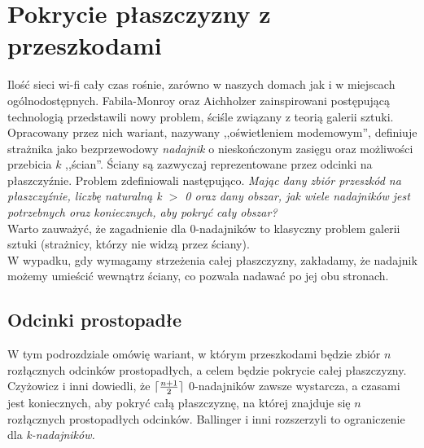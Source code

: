 \documentclass[brudnopis]{xmgr}
\DeclarePairedDelimiter\ceil{\lceil}{\rceil}
\begin{document}
\section{Pokrycie płaszczyzny z przeszkodami}
	Ilość sieci wi-fi cały czas rośnie, zarówno w naszych domach jak i w miejscach ogólnodostępnych. Fabila-Monroy oraz Aichholzer zainspirowani postępującą technologią przedstawili nowy problem, ściśle związany z teorią galerii sztuki. Opracowany przez nich wariant, nazywany ,,oświetleniem modemowym'', definiuje strażnika jako bezprzewodowy \textit{nadajnik} o nieskończonym zasięgu oraz możliwości przebicia $k$ ,,ścian''. Ściany są zazwyczaj reprezentowane przez odcinki na płaszczyźnie. Problem zdefiniowali następująco.
\textit{Mając dany zbiór przeszkód na płaszczyźnie, liczbę naturalną k $>$ 0 oraz dany obszar, jak wiele  nadajników jest potrzebnych oraz koniecznych, aby pokryć cały obszar?}  
\\\indent Warto zauważyć, że zagadnienie dla 0-nadajników to klasyczny problem galerii sztuki (strażnicy, którzy nie widzą przez ściany).
\\W wypadku, gdy wymagamy strzeżenia całej płaszczyzny, zakładamy, że nadajnik możemy umieścić wewnątrz ściany, co pozwala nadawać po jej obu stronach.
\subsection{Odcinki prostopadłe}
W tym podrozdziale omówię wariant, w którym przeszkodami będzie zbiór $n$ rozłącznych odcinków prostopadłych, a celem będzie pokrycie całej płaszczyzny. Czyżowicz i inni dowiedli, że $\ceil{\frac{n+1}{2}}$ 0-nadajników zawsze wystarcza, a czasami jest koniecznych, aby pokryć całą płaszczyznę, na której znajduje się $n$ rozłącznych prostopadłych odcinków. Ballinger i inni rozszerzyli to ograniczenie dla \textit{k-nadajników.}
\end{document}
